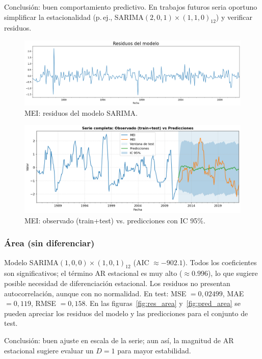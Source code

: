 Conclusión: buen comportamiento predictivo. En trabajos futuros seria oportuno simplificar
la estacionalidad (p.\,ej., SARIMA$(2,0,1)\times(1,1,0)_{12}$) y verificar residuos.
\vspace{0.3em}

\begin{figure}[H]\centering
\includegraphics[scale=.30]{Figures/res_sarima_mei.png}
\caption{MEI: residuos del modelo SARIMA.}
\label{fig:res_mei}
\end{figure}


\begin{figure}[H]\centering
\includegraphics[scale=.42]{Figures/pred_mei.png}
\caption{MEI: observado (train+test) vs. predicciones con IC 95\%.}
\label{fig:pred_mei}
\end{figure}


\subsubsection{Área (sin diferenciar)}
Modelo SARIMA$(1,0,0)\times(1,0,1)_{12}$ 
(AIC $\approx -902.1$). Todos los coeficientes son significativos; el término AR estacional
es muy alto ($\approx 0.996$), lo que sugiere posible necesidad de diferenciación
estacional. Los residuos no presentan autocorrelación, aunque con no normalidad.
En test: MSE $=0,02499$, MAE $=0,119$, RMSE $=0,158$. En las figuras~\ref{fig:res_area} y~\ref{fig:pred_area} se pueden apreciar los residuos del modelo y las predicciones para el conjunto de test.

Conclusión: buen ajuste en escala de la serie; aun así, la magnitud de AR estacional sugiere evaluar un $D=1$ para mayor estabilidad.
\vspace{0.3em}

